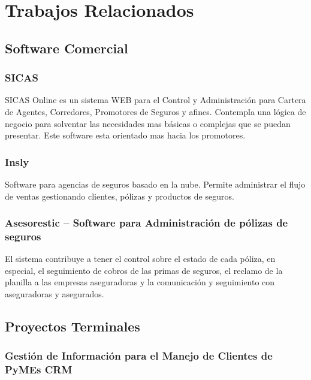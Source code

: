 \section{Trabajos Relacionados}
\subsection*{Software Comercial}
\subsubsection*{SICAS \cite{www:sicas}} 

SICAS Online es un sistema WEB para el Control y Administración para Cartera de Agentes, Corredores, Promotores de Seguros y afines. Contempla una lógica de negocio para solventar las necesidades mas básicas o complejas que se puedan presentar. Este software esta orientado mas hacia los promotores.

\subsubsection*{Insly \cite{www:insly}}

Software para agencias de seguros basado en la nube. Permite administrar el flujo de ventas gestionando clientes, pólizas y productos de seguros.

\subsubsection*{Asesorestic – Software para Administración de pólizas de seguros \cite{www:asesorestic}}

El sistema contribuye a tener el control sobre el estado de cada póliza, en especial, el seguimiento de cobros de las primas de seguros, el reclamo de la planilla a las empresas aseguradoras y la comunicación y seguimiento con aseguradoras y asegurados.

\subsection*{Proyectos Terminales}

\subsubsection*{Gestión de Información para el Manejo de Clientes de PyMEs CRM \cite{pro:crm}}


